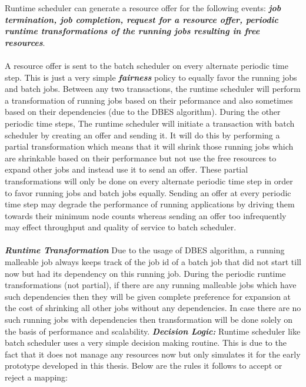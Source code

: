Runtime scheduler can generate a resource offer for the following events: \textbf{\textit{job termination, job completion, request for a resource offer, periodic runtime transformations of the running jobs resulting in free resources}}.\\ \\
A resource offer is sent to the batch scheduler on every alternate periodic time step. This is just a very simple \textbf{\textit{fairness}} policy to equally favor the running jobs and batch jobs. Between any two transactions, the runtime scheduler will perform a transformation of running jobs based on their peformance and also sometimes based on their dependencies (due to the DBES algorithm). During the other periodic time steps, The runtime scheduler will initiate a transaction with batch scheduler by creating an offer and sending it. It will do this by performing a partial transformation which means that it will shrink those running jobs which are shrinkable based on their performance but not use the free resources to expand other jobs and instead use it to send an offer. These partial transformations will only be done on every alternate periodic time step in order to favor running jobs and batch jobs equally. Sending an offer at every periodic time step may degrade the performance of running applications by driving them towards their minimum node counts whereas sending an offer too infrequently may effect throughput and quality of service to batch scheduler.\\ \\
\textbf{\textit{Runtime Transformation}} Due to the usage of DBES algorithm, a running malleable job always keeps track of the job id of a batch job that did not start till now but had its dependency on this running job. During the periodic runtime transformations (not partial), if there are any running malleable jobs which have such dependencies then they will be given complete preference for expansion at the cost of shrinking all other jobs without any dependencies. In case there are no such running jobs with dependencies then transformation will be done solely on the basis of performance and scalability.
\noindent
\textbf{\textit{Decision Logic:}} Runtime scheduler like batch scheduler uses a very simple decision making routine. This is due to the fact that it does not manage any resources now but only simulates it for the early prototype developed in this thesis. Below are the rules it follows to accept or reject a mapping:
